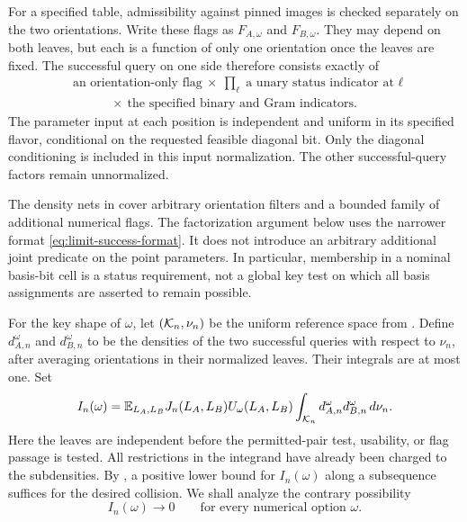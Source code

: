 For a specified table, admissibility against pinned images is checked
separately on the two orientations. Write these flags as
$F_{A,\omega}$ and $F_{B,\omega}$. They may depend on both leaves, but
each is a function of only one orientation once the leaves are fixed.
The successful query on one side therefore consists exactly of
\begin{equation}
\label{eq:limit-success-format}
\begin{aligned}
&\text{an orientation-only flag}\ \times\
  \prod_{\ell}\text{a unary status indicator at $\ell$}\\
&\hspace{3em}\times\ \text{the specified binary and Gram indicators}.
\end{aligned}
\end{equation}
The parameter input at each position is independent and uniform in its
specified flavor, conditional on the requested feasible diagonal bit.
Only the diagonal conditioning is included in this input normalization.
The other successful-query factors remain unnormalized.

\begin{remark}
\label{rem:limit-filter-boundary}
The density nets in  cover arbitrary
orientation filters and a bounded family of additional numerical flags.
The factorization argument below uses the narrower format
\eqref{eq:limit-success-format}. It does not introduce an arbitrary
additional joint predicate on the point parameters. In particular,
membership in a nominal basis-bit cell is a status requirement, not a
global key test on which all basis assignments are asserted to remain
possible.
\end{remark}

For the key shape of $\omega$, let $(\mathcal K_n,\nu_n)$ be the uniform
reference space from \Cref{sec:collision}. Define $d_{A,n}^\omega$ and
$d_{B,n}^\omega$ to be the densities of the two successful queries with
respect to $\nu_n$, after averaging orientations in their normalized
leaves. Their integrals are at most one. Set
\begin{equation}
\label{eq:limit-option-overlap}
I_n(\omega)=
\mathbb E_{L_A,L_B} J_n(L_A,L_B)U_\omega(L_A,L_B)
\int_{\mathcal K_n}d_{A,n}^\omega d_{B,n}^\omega\,d\nu_n.
\end{equation}
Here the leaves are independent before the permitted-pair test, usability,
or flag passage is tested. All restrictions in the integrand have already been charged to
the subdensities. By \Cref{prop:collision}, a positive lower bound for
$I_n(\omega)$ along a subsequence suffices for the desired collision.
We shall analyze the contrary possibility
\begin{equation}
\label{eq:limit-vanishing-overlap}
I_n(\omega)\longrightarrow0\qquad\text{for every numerical option }\omega.
\end{equation}

